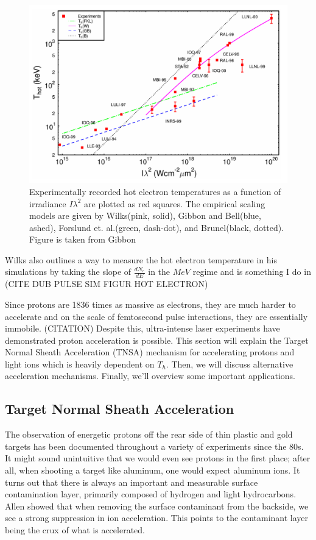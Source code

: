 \begin{figure}
	\centering 
	\includegraphics[width=\linewidth]{planning/images/gibbon_hot_electron.PNG}
	\caption{Experimentally recorded hot electron temperatures as a function of irradiance $I \lambda^2$ are plotted as red squares. The empirical scaling models are given by Wilks\cite{Wilks_1992_PRL}(pink, solid), Gibbon and Bell\cite{Gibbon_1992_PRL}(blue, ashed), Forslund et. al.\cite{Forslund_1977_PRL}(green, dash-dot), and Brunel\cite{Brunel_1987_PRL}(black, dotted). Figure is taken from Gibbon\cite{Gibbon_2005_Plasma}}
	\label{fig:electron_scaling}
\end{figure}
Wilks also outlines a way to measure the hot electron temperature in his simulations\cite{Wilks_1992_PRL} by taking the slope of $\frac{dN_e}{dE}$ in the $MeV$ regime and is something I do in (CITE DUB PULSE SIM FIGUR HOT ELECTRON)

Since protons are 1836 times as massive as electrons, they are much harder to accelerate and on the scale of femtosecond pulse interactions, they are essentially immobile. (CITATION) Despite this, ultra-intense laser experiments have demonstrated proton acceleration is possible. This section will explain the Target Normal Sheath Acceleration (TNSA) mechanism for accelerating protons and light ions which is heavily dependent on $T_h$. Then, we will discuss alternative acceleration mechanisms. Finally, we'll overview some important applications.

\subsection{Target Normal Sheath Acceleration}
The observation of energetic protons off the rear side of thin plastic and gold targets has been documented throughout a variety of experiments since the 80s\cite{Tan_1984_PoF}. It might sound unintuitive that we would even see protons in the first place; after all, when shooting a target like aluminum, one would expect aluminum ions. It turns out that there is always an important and measurable surface contamination layer, primarily composed of hydrogen and light hydrocarbons\cite{Gitomer_1986_PoF}. Allen \cite{Allen_2004_PRL} showed that when removing the surface contaminant from the backside, we see a strong suppression in ion acceleration. This points to the contaminant layer being the crux of what is accelerated.

